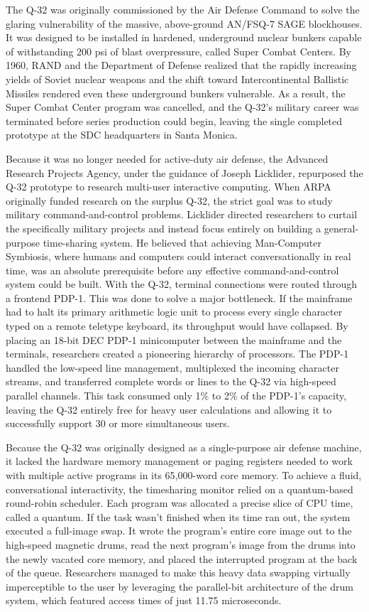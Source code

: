The Q-32 was originally commissioned by the Air Defense Command to solve the glaring vulnerability of the massive, above-ground AN/FSQ-7 SAGE blockhouses. It was designed to be installed in hardened, underground nuclear bunkers capable of withstanding 200 psi of blast overpressure, called Super Combat Centers. By 1960, RAND and the Department of Defense realized that the rapidly increasing yields of Soviet nuclear weapons and the shift toward Intercontinental Ballistic Missiles rendered even these underground bunkers vulnerable. As a result, the Super Combat Center program was cancelled, and the Q-32's military career was terminated before series production could begin, leaving the single completed prototype at the SDC headquarters in Santa Monica.

Because it was no longer needed for active-duty air defense, the Advanced Research Projects Agency, under the guidance of Joseph Licklider, repurposed the Q-32 prototype to research multi-user interactive computing. When ARPA originally funded research on the surplus Q-32, the strict goal was to study military command-and-control problems. Licklider directed researchers to curtail the specifically military projects and instead focus entirely on building a general-purpose time-sharing system. He believed that achieving Man-Computer Symbiosis, where humans and computers could interact conversationally in real time, was an absolute prerequisite before any effective command-and-control system could be built.
With the Q-32, terminal connections were routed through a frontend PDP-1. This was done to solve a major bottleneck. If the mainframe had to halt its primary arithmetic logic unit to process every single character typed on a remote teletype keyboard, its throughput would have collapsed. By placing an 18-bit DEC PDP-1 minicomputer between the mainframe and the terminals, researchers created a pioneering hierarchy of processors. The PDP-1 handled the low-speed line management, multiplexed the incoming character streams, and transferred complete words or lines to the Q-32 via high-speed parallel channels. This task consumed only 1\% to 2\% of the PDP-1's capacity, leaving the Q-32 entirely free for heavy user calculations and allowing it to successfully support 30 or more simultaneous users.

Because the Q-32 was originally designed as a single-purpose air defense machine, it lacked the hardware memory management or paging registers needed to work with multiple active programs in its 65,000-word core memory. To achieve a fluid, conversational interactivity, the timesharing monitor relied on a quantum-based round-robin scheduler. Each program was allocated a precise slice of CPU time, called a quantum. If the task wasn't finished when its time ran out, the system executed a full-image swap. It wrote the program's entire core image out to the high-speed magnetic drums, read the next program's image from the drums into the newly vacated core memory, and placed the interrupted program at the back of the queue. Researchers managed to make this heavy data swapping virtually imperceptible to the user by leveraging the parallel-bit architecture of the drum system, which featured access times of just 11.75 microseconds.

